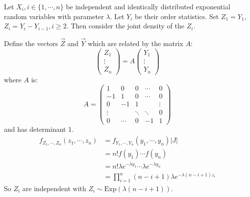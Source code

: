 \documentclass[../Main.tex]{subfiles}
\begin{document}
\begin{example}
    Let $X_i, i \in \{1, \cdots, n\}$ be independent and identically distributed exponential random variables with parameter $\lambda$. Let $Y_i$ be their order statistics. Set $Z_1 = Y_1$, $Z_i = Y_i - Y_{i-1}, i \geq 2$. Then consider the joint density of the $Z_i$.

    Define the vectors $\vec{Z}$ and $\vec{Y}$ which are related by the matrix $A$:
    \begin{equation*}
        \begin{pmatrix}Z_1 \\ \vdots \\ Z_n\end{pmatrix} = A \begin{pmatrix}Y_1 \\ \vdots \\ Y_n\end{pmatrix}
    \end{equation*}
    where $A$ is:
    \begin{equation*}
        A = 
        \begin{pmatrix}
            1&0&0&\cdots&0 \\
            -1&1&0&\cdots&0 \\
            0&-1&1& & \vdots \\
            \vdots& &\ddots&\ddots&0 \\
            0 &\cdots&0&-1&1
        \end{pmatrix}
    \end{equation*}
    and has determinant 1.
    \begin{align*}
        f_{Z_1, \cdots, Z_n}(z_1, \cdots, z_n) &= f_{Y_1, \cdots, Y_n}(y_1, \cdots, y_n) |J| \\
        &= n! f(y_1) \cdots f(y_n) \\
        &= n! \lambda e^{-\lambda y_1} \cdots \lambda e^{-\lambda y_n} \\
        &= \prod_{i = 1}^n (n - i + 1) \lambda e^{-\lambda(n - i + 1)z_i}
    \end{align*}
    So $Z_i$ are independent with $Z_i \sim \text{Exp}(\lambda(n - i + 1))$.
\end{example}
\end{document}
